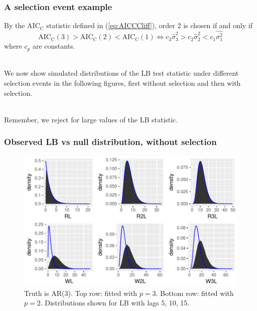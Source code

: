 \documentclass{beamer}
\begin{document}
\begin{frame}
  \frametitle{A selection event example}
By the $\mathrm{AIC_C}$ statistic defined in (\ref{eq:AICCCliff}), order 2 is chosen if and only if
\begin{equation*}
\mathrm{AIC_{C}}(3)>\mathrm{AIC_{C}}(2)<\mathrm{AIC_{C}}(1)\Leftrightarrow c_{3} \widehat{\sigma}_3^2> c_2 \widehat{\sigma}_2^2 <  c_{1} \widehat{\sigma_{1}^2}
\end{equation*}
where $c_p$ are constants. \\

\

We now show simulated distributions of the LB test statistic under different selection events in the following figures, first without selection and then with selection. \\

\

Remember, we reject for large values of the LB statistic.
\end{frame}


\begin{frame}
\frametitle{Observed LB vs null distribution, without selection}
\begin{figure}
\begin{center}
\includegraphics[scale=0.6]{true3fit2_all}
\caption{Truth is AR(3). Top row: fitted with $p = 3$. Bottom row: fitted with $p = 2$. Distributions shown for LB with lags 5, 10, 15.}
\end{center}
\end{figure}
\end{frame}
\end{document}
